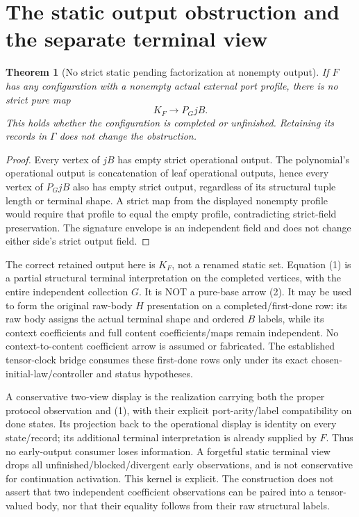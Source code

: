 \documentclass[11pt]{article}
\newtheorem{theorem}{Theorem}\newtheorem{proposition}{Proposition}
\begin{document}
\section{The static output obstruction and the separate terminal view}
\begin{theorem}[No strict static pending factorization at nonempty output]
If $F$ has any configuration with a nonempty actual external port profile, there is no strict pure map
\[
                       K_F\longrightarrow P_G jB.              \tag{2}
\]
This holds whether the configuration is completed or unfinished. Retaining its records in $\Gamma$ does not change the obstruction.
\end{theorem}
\begin{proof}
Every vertex of $jB$ has empty strict operational output. The polynomial's operational output is concatenation of leaf operational outputs, hence every vertex of $P_GjB$ also has empty strict output, regardless of its structural tuple length or terminal shape. A strict map from the displayed nonempty profile would require that profile to equal the empty profile, contradicting strict-field preservation. The signature envelope is an independent field and does not change either side's strict output field.\end{proof}

The correct retained output here is $K_F$, not a renamed static set. Equation (1) is a partial structural terminal interpretation on the completed vertices, with the entire independent collection $G$. It is NOT a pure-base arrow (2). It may be used to form the original raw-body $H$ presentation on a completed/first-done row: its raw body assigns the actual terminal shape and ordered $B$ labels, while its context coefficients and full content coefficients/maps remain independent. No context-to-content coefficient arrow is assumed or fabricated. The established tensor-clock bridge consumes these first-done rows only under its exact chosen-initial-law/controller and status hypotheses.

A conservative two-view display is the realization carrying both the proper protocol observation and (1), with their explicit port-arity/label compatibility on done states. Its projection back to the operational display is identity on every state/record; its additional terminal interpretation is already supplied by $F$. Thus no early-output consumer loses information. A forgetful static terminal view drops all unfinished/blocked/divergent early observations, and is not conservative for continuation activation. This kernel is explicit. The construction does not assert that two independent coefficient observations can be paired into a tensor-valued body, nor that their equality follows from their raw structural labels.
\end{document}
